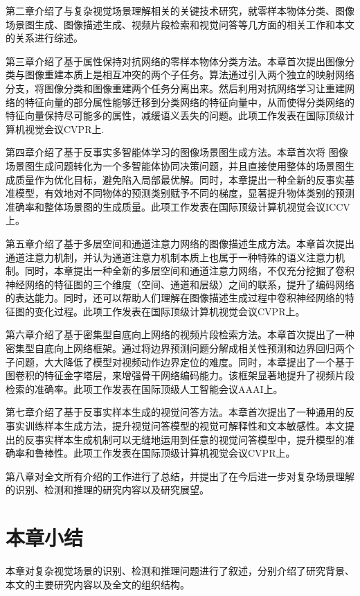 \begin{asparaitem}

\item 第二章介绍了与复杂视觉场景理解相关的关键技术研究，就零样本物体分类、图像场景图生成、图像描述生成、视频片段检索和视觉问答等几方面的相关工作和本文的关系进行综述。

\item 第三章介绍了基于属性保持对抗网络的零样本物体分类方法。本章首次提出图像分类与图像重建本质上是相互冲突的两个子任务。算法通过引入两个独立的映射网络分支，将图像分类和图像重建两个任务分离出来。然后利用对抗网络学习让重建网络的特征向量的部分属性能够迁移到分类网络的特征向量中，从而使得分类网络的特征向量保持尽可能多的属性，减缓语义丢失的问题。此项工作发表在国际顶级计算机视觉会议CVPR上.

\item 第四章介绍了基于反事实多智能体学习的图像场景图生成方法。本章首次将
图像场景图生成问题转化为一个多智能体协同决策问题，并且直接使用整体的场景图生成质量作为优化目标，避免陷入局部最优解。同时，本章提出一种全新的反事实基准模型，有效地对不同物体的预测类别赋予不同的梯度，显著提升物体类别的预测准确率和整体场景图的生成质量。此项工作发表在国际顶级计算机视觉会议ICCV上。

\item 第五章介绍了基于多层空间和通道注意力网络的图像描述生成方法。本章首次提出通道注意力机制，并认为通道注意力机制本质上也属于一种特殊的语义注意力机制。同时，本章提出一种全新的多层空间和通道注意力网络，不仅充分挖掘了卷积神经网络的特征图的三个维度（空间、通道和层级）之间的联系，提升了编码网络的表达能力。同时，还可以帮助人们理解在图像描述生成过程中卷积神经网络的特征图的变化过程。此项工作发表在国际顶级计算机视觉会议CVPR上。

\item 第六章介绍了基于密集型自底向上网络的视频片段检索方法。本章首次提出了一种密集型自底向上网络框架。通过将边界预测问题分解成相关性预测和边界回归两个子问题，大大降低了模型对视频动作边界定位的难度。同时，本章提出了一个基于图卷积的特征金字塔层，来增强骨干网络编码能力。该框架显著地提升了视频片段检索的准确率。此项工作发表在国际顶级人工智能会议AAAI上。

\item 第七章介绍了基于反事实样本生成的视觉问答方法。本章首次提出了一种通用的反事实训练样本生成方法，提升视觉问答模型的视觉可解释性和文本敏感性。本文提出的反事实样本生成机制可以无缝地运用到任意的视觉问答模型中，提升模型的准确率和鲁棒性。此项工作发表在国际顶级计算机视觉会议CVPR上。

\item 第八章对全文所有介绍的工作进行了总结，并提出了在今后进一步对复杂场景理解的识别、检测和推理的研究内容以及研究展望。

\end{asparaitem}

\section{本章小结}
本章对复杂视觉场景的识别、检测和推理问题进行了叙述，分别介绍了研究背景、本文的主要研究内容以及全文的组织结构。

